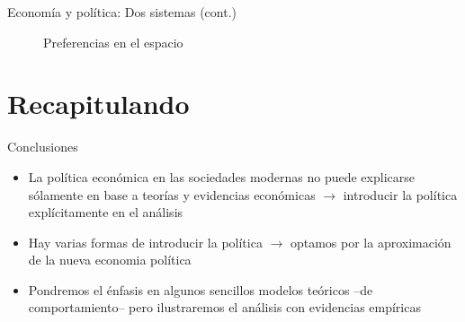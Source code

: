 \documentclass[14pt,aspectratio=169]{beamer}
\begin{document}
\begin{frame}{Economía y política: Dos sistemas (cont.)}
 \begin{figure}
    \centering
    \caption{Preferencias en el espacio}
  \end{figure}

\end{frame}




\section{Recapitulando}

\begin{frame}{Conclusiones}
  \begin{itemize}
    \item La política económica en las sociedades modernas no puede
      explicarse sólamente en base a teorías y evidencias económicas
      $\longrightarrow$ introducir la política explícitamente en el análisis
      \item Hay varias formas de introducir la política
        $\longrightarrow$ optamos por la aproximación de la nueva
        economia política
        \item Pondremos el énfasis en algunos sencillos modelos
          teóricos --de comportamiento-- pero ilustraremos el análisis
          con evidencias empíricas
  \end{itemize}

\end{frame}
\end{document}
